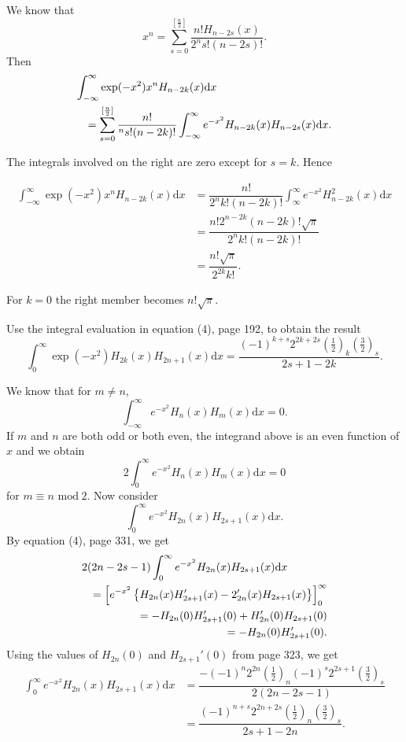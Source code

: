 \begin{solution}
We know that 
$$x^n = \displaystyle\sum_{s=0}^{[\frac{n}{2}]} \dfrac{n! H_{n-2s}(x)}{2^n s! (n-2s)!}.$$
Then
\begin{eqnarray*}
\lefteqn{\displaystyle\int_{-\infty}^{\infty} \exp(-x^2) x^n H_{n-2k}(x) \mathrm{d}x} \\
&&= \displaystyle\sum_{s=0}^{[\frac{n}{2}]} \dfrac{n!}{^n s! (n-2k)!} \displaystyle\int_{-\infty}^{\infty} e^{-x^2} H_{n-2k}(x) H_{n-2s}(x) \mathrm{d}x.
\end{eqnarray*}

The integrals involved on the right are zero except for $s=k$. Hence

$$\begin{array}{ll}
\displaystyle\int_{-\infty}^{\infty} \exp(-x^2)x^n H_{n-2k}(x)\mathrm{d}x &= \dfrac{n!}{2^n k! (n-2k)!} \displaystyle\int_{\infty}^{\infty} e^{-x^2} H_{n-2k}^2(x) \mathrm{d}x \\
&= \dfrac{n!2^{n-2k}(n-2k)! \sqrt{\pi}}{2^n k! (n-2k)!} \\
&= \dfrac{n! \sqrt{\pi}}{2^{2k}k!}.
\end{array}$$

For $k=0$ the right member becomes $n! \sqrt{\pi}$.
\end{solution}
\begin{problem}\label{problem3chapter11}
Use the integral evaluation in equation (4), page 192, to obtain the result
$$\displaystyle\int_0^{\infty} \exp(-x^2) H_{2k}(x) H_{2n+1}(x) \mathrm{d}x = \dfrac{(-1)^{k+s}2^{2k+2s}(\frac{1}{2})_k (\frac{3}{2})_s}{2s+1-2k}.$$
\end{problem}
\begin{solution}
We know that for $m \neq n$,
$$\displaystyle\int_{-\infty}^{\infty} e^{-x^2} H_n(x) H_m(x) \mathrm{d}x =0.$$
If $m$ and $n$ are both odd or both even, the integrand above is an even function of $x$ and we obtain
$$2 \displaystyle\int_0^{\infty} e^{-x^2} H_n(x) H_m(x)\mathrm{d}x =0$$
for $m \equiv n \hspace{4pt}\mathrm{mod} \hspace{3pt} 2$.
Now consider
$$\displaystyle\int_0^{\infty} e^{-x^2} H_{2n}(x) H_{2s+1}(x)\mathrm{d}x.$$
By equation (4), page 331, we get
\begin{eqnarray*}
\lefteqn{2(2n-2s-1) \displaystyle\int_0^{\infty} e^{-x^2} H_{2n}(x) H_{2s+1}(x) \mathrm{d}x} \\
& &= \left[ e^{-x^2} \left\{ H_{2n}(x) H_{2s+1}'(x) - 2_{2n}'(x) H_{2s+1}(x) \right\} \right]_0^{\infty} \\
&&= -H_{2n}(0)H_{2s+1}'(0) + H_{2n}'(0)H_{2s+1}(0) \\
&&= -H_{2n}(0)H_{2s+1}'(0).
\end{eqnarray*}
Using the values of $H_{2n}(0)$ and $H_{2s+1}'(0)$ from page 323, we get
$$\begin{array}{ll}
\displaystyle\int_0^{\infty} e^{-x^2}H_{2n}(x)H_{2s+1}(x) \mathrm{d}x &= \dfrac{-(-1)^n2^{2n}(\frac{1}{2})_n (-1)^s 2^{2s+1} (\frac{3}{2})_s}{2(2n-2s-1)} \\
&= \dfrac{(-1)^{n+s} 2^{2n+2s} (\frac{1}{2})_n (\frac{3}{2})_s}{2s+1-2n}.
\end{array}$$
\end{solution}
